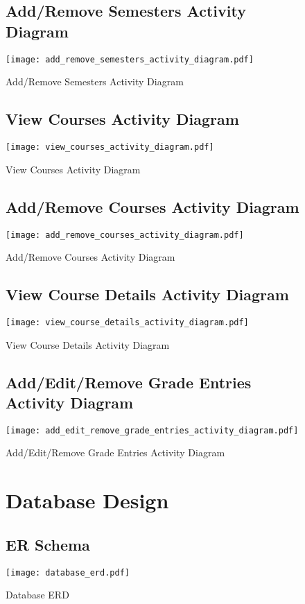 \documentclass[12pt]{article}
\begin{document}
\begin{figure}[p!]
  \subsection{Add/Remove Semesters Activity Diagram}
  \centering
  \texttt{[image: add\_remove\_semesters\_activity\_diagram.pdf]}
  \caption{Add/Remove Semesters Activity Diagram}
\end{figure}

\begin{figure}[p!]
  \subsection{View Courses Activity Diagram}
  \centering
  \texttt{[image: view\_courses\_activity\_diagram.pdf]}
  \caption{View Courses Activity Diagram}
\end{figure}

\begin{figure}[p!]
  \subsection{Add/Remove Courses Activity Diagram}
  \centering
  \texttt{[image: add\_remove\_courses\_activity\_diagram.pdf]}
  \caption{Add/Remove Courses Activity Diagram}
\end{figure}

\begin{figure}[p!]
  \subsection{View Course Details Activity Diagram}
  \centering
  \texttt{[image: view\_course\_details\_activity\_diagram.pdf]}
  \caption{View Course Details Activity Diagram}
\end{figure}

\begin{figure}[p!]
  \subsection{Add/Edit/Remove Grade Entries Activity Diagram}
  \centering
  \texttt{[image: add\_edit\_remove\_grade\_entries\_activity\_diagram.pdf]}
  \caption{Add/Edit/Remove Grade Entries Activity Diagram}
\end{figure}

\begin{figure}[p!]
  \section{Database Design}
  \subsection{ER Schema}
  \centering
  \texttt{[image: database\_erd.pdf]}
  \caption{Database ERD}
\end{figure}
\end{document}
